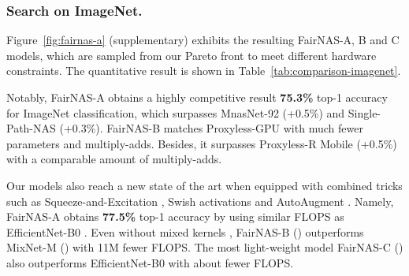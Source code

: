 \documentclass[10pt,twocolumn,letterpaper]{article}
\theoremstyle{definition}
\begin{document}
\subsubsection{Search on ImageNet.}
Figure~\ref{fig:fairnas-a} (supplementary) exhibits the resulting FairNAS-A, B and C models, which are sampled from our Pareto front to meet different hardware constraints. The quantitative result is shown in Table~\ref{tab:comparison-imagenet}.



Notably, FairNAS-A obtains a highly competitive result \textbf{75.3\%} top-1 accuracy for ImageNet classification, which surpasses MnasNet-92 (+0.5\%) and Single-Path-NAS (+0.3\%). FairNAS-B matches Proxyless-GPU with much fewer parameters and multiply-adds. Besides, it surpasses Proxyless-R Mobile (+0.5\%) with a comparable amount of multiply-adds.

Our models also reach a new state of the art when equipped with combined tricks such as Squeeze-and-Excitation \cite{hu2018squeeze}, Swish activations \cite{ramachandran2017searching} and AutoAugment \cite{cubuk2018autoaugment}. Namely, FairNAS-A obtains \textbf{77.5\%} top-1 accuracy by using similar FLOPS as EfficientNet-B0 . Even without mixed kernels \cite{tan2020mixconv}, FairNAS-B () outperforms MixNet-M () with 11M fewer FLOPS. The most light-weight model FairNAS-C ()  also outperforms EfficientNet-B0 with about  fewer FLOPS.
\end{document}
